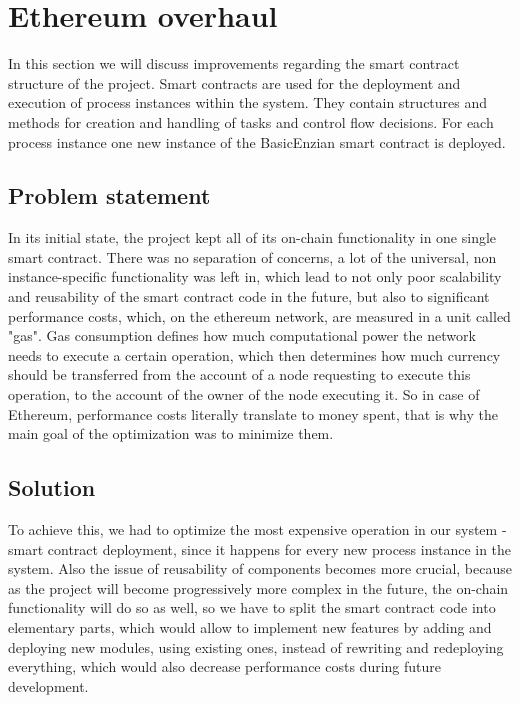%
\section{Ethereum overhaul}
\label{sec:impr:eth}

In this section we will discuss improvements regarding the smart contract structure of the project. Smart contracts are used for the deployment and execution of process instances within the system. They contain structures and methods for creation and handling of tasks and control flow decisions. For each process instance one new instance of the BasicEnzian smart contract is deployed.

\subsection{Problem statement}
\label{sec:impr:eth:problem}

In its initial state, the project kept all of its on-chain functionality in one single smart contract. There was no separation of concerns, a lot of the universal, non instance-specific functionality was left in, which lead to not only poor scalability and reusability of the smart contract code in the future, but also to significant performance costs, which, on the ethereum network, are measured in a unit called "gas". Gas consumption defines how much computational power the network needs to execute a certain operation, which then determines how much currency should be transferred from the account of a node requesting to execute this operation, to the account of the owner of the node executing it. So in case of Ethereum, performance costs literally translate to money spent, that is why the main goal of the optimization was to minimize them.

\subsection{Solution}
\label{sec:impr:eth:solution}

To achieve this, we had to optimize the most expensive operation in our system - smart contract deployment, since it happens for every new process instance in the system. Also the issue of reusability of components becomes more crucial, because as the project will become progressively more complex in the future, the on-chain functionality will do so as well, so we have to split the smart contract code into elementary parts, which would allow to implement new features by adding and deploying new modules, using existing ones, instead of rewriting and redeploying everything, which would also decrease performance costs during future development.\\

